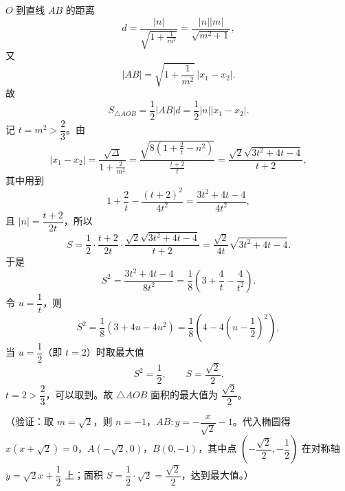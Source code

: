 \begin{answer}
\(O\) 到直线 \(AB\) 的距离
\nopagebreak[4]
\[
d=\frac{|n|}{\sqrt{1+\frac{1}{m^2}}}
=\frac{|n||m|}{\sqrt{m^2+1}},
\]
又
\nopagebreak[4]
\[
|AB|=\sqrt{1+\frac{1}{m^2}}\,|x_1-x_2|.
\]
故
\nopagebreak[4]
\[
S_{\triangle AOB}=\frac12|AB|d=\frac12|n||x_1-x_2|.
\]
记 \(t=m^2>\dfrac23\)。由
\nopagebreak[4]
\[
|x_1-x_2|=\frac{\sqrt\Delta}{1+\frac{2}{m^2}}
=\frac{\sqrt{8\left(1+\frac{2}{t}-n^2\right)}}{\frac{t+2}{t}}
=\frac{\sqrt2\sqrt{3t^2+4t-4}}{t+2},
\]
其中用到
\nopagebreak[4]
\[
1+\frac{2}{t}-\frac{(t+2)^2}{4t^2}
=\frac{3t^2+4t-4}{4t^2},
\]
且 \(|n|=\dfrac{t+2}{2t}\)，所以
\nopagebreak[4]
\[
S=\frac12\cdot\frac{t+2}{2t}\cdot\frac{\sqrt2\sqrt{3t^2+4t-4}}{t+2}
=\frac{\sqrt2}{4t}\sqrt{3t^2+4t-4}.
\]
于是
\nopagebreak[4]
\[
S^2=\frac{3t^2+4t-4}{8t^2}
=\frac18\left(3+\frac4t-\frac4{t^2}\right).
\]
令 \(u=\dfrac1t\)，则
\nopagebreak[4]
\[
S^2=\frac18\left(3+4u-4u^2\right)
=\frac18\left(4-4\left(u-\frac12\right)^2\right),
\]
当 \(u=\dfrac12\)（即 \(t=2\)）时取最大值
\nopagebreak[4]
\[
S^2=\frac12,\qquad S=\frac{\sqrt2}{2}.
\]
\(t=2>\dfrac23\)，可以取到。故 \(\triangle AOB\) 面积的最大值为 \(\dfrac{\sqrt2}{2}\)。

（验证：取 \(m=\sqrt2\)，则 \(n=-1\)，\(AB:y=-\dfrac{x}{\sqrt2}-1\)。代入椭圆得 \(x(x+\sqrt2)=0\)，\(A(-\sqrt2,0)\)，\(B(0,-1)\)，其中点 \(\left(-\dfrac{\sqrt2}{2},-\dfrac12\right)\) 在对称轴 \(y=\sqrt2x+\dfrac12\) 上；面积 \(S=\dfrac12\cdot\sqrt2=\dfrac{\sqrt2}{2}\)，达到最大值。）



\end{answer}
